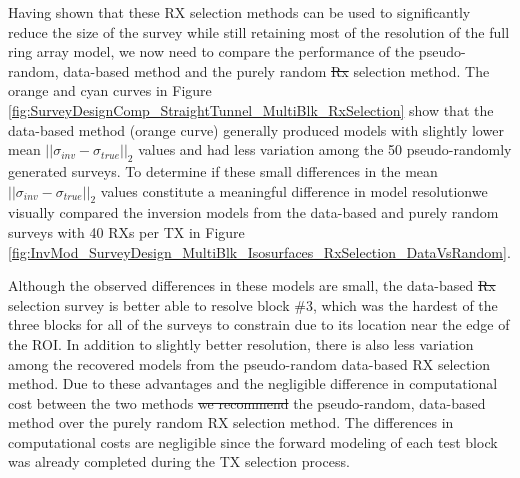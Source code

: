 \documentclass[preprint,authoryear,12pt]{elsarticle}
\providecommand{\DIFaddtex}[1]{{\protect\color{blue}\uwave{#1}}} %
\providecommand{\DIFdeltex}[1]{{\protect\color{red}\sout{#1}}}                      %
\providecommand{\DIFaddbegin}{} %
\providecommand{\DIFaddend}{} %
\providecommand{\DIFdelbegin}{} %
\providecommand{\DIFdelend}{} %
\providecommand{\DIFadd}[1]{\texorpdfstring{\DIFaddtex{#1}}{#1}} %
\providecommand{\DIFdel}[1]{\texorpdfstring{\DIFdeltex{#1}}{}} %
\begin{document}
Having shown that these RX selection methods can be used to significantly reduce the size of the survey while still retaining most of the resolution of the full ring array model, we now need to compare the performance of the pseudo-random, data-based method and the purely random \DIFdelbegin \DIFdel{Rx }\DIFdelend \DIFaddbegin \DIFadd{RX }\DIFaddend selection method. The orange and cyan curves in Figure \ref{fig:SurveyDesignComp_StraightTunnel_MultiBlk_RxSelection} show that the data-based method (orange curve) generally produced models with slightly lower mean $\left|| \sigma_{inv} - \sigma_{true} \right||_2$ values and had less variation among the 50 pseudo-randomly generated surveys. To determine if these small differences in the mean $\left|| \sigma_{inv} - \sigma_{true} \right||_2$ values constitute a meaningful difference in model resolution\DIFaddbegin \DIFadd{, }\DIFaddend we visually compared the inversion models from the data-based and purely random surveys with 40 RXs per TX in Figure \ref{fig:InvMod_SurveyDesign_MultiBlk_Isosurfaces_RxSelection_DataVsRandom}.

Although the observed differences in these models are small, the data-based \DIFdelbegin \DIFdel{Rx }\DIFdelend \DIFaddbegin \DIFadd{RX }\DIFaddend selection survey is better able to resolve block \#3, which was the hardest of the three blocks for all of the surveys to constrain due to its location near the edge of the ROI. In addition to slightly better resolution, there is also less variation among the recovered models from the pseudo-random data-based RX selection method. Due to these advantages and the negligible difference in computational cost between the two methods \DIFdelbegin \DIFdel{we recommend }\DIFdelend the pseudo-random, data-based method \DIFaddbegin \DIFadd{is preferred }\DIFaddend over the purely random RX selection method. The differences in computational costs are negligible since the forward modeling of each test block was already completed during the TX selection process.


\DIFdelbegin %
\end{document}
